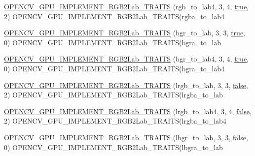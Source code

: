 \begin{DoxyCompactItemize}
\hyperlink{namespacecv_1_1gpu_1_1device_a70dc4c7bdbee3eb29835242b0f7cce81}{O\-P\-E\-N\-C\-V\-\_\-\-G\-P\-U\-\_\-\-I\-M\-P\-L\-E\-M\-E\-N\-T\-\_\-\-R\-G\-B2\-Lab\-\_\-\-T\-R\-A\-I\-T\-S} (rgb\-\_\-to\-\_\-lab4, 3, 4, \hyperlink{namespacecv_1_1gpu_1_1device_ac34c172a7a1904fb0fd477321a31f926}{true}, 2) O\-P\-E\-N\-C\-V\-\_\-\-G\-P\-U\-\_\-\-I\-M\-P\-L\-E\-M\-E\-N\-T\-\_\-\-R\-G\-B2\-Lab\-\_\-\-T\-R\-A\-I\-T\-S(rgba\-\_\-to\-\_\-lab4
\item 
\hyperlink{namespacecv_1_1gpu_1_1device_a4bfbf042d11f699daedb325c0801e223}{O\-P\-E\-N\-C\-V\-\_\-\-G\-P\-U\-\_\-\-I\-M\-P\-L\-E\-M\-E\-N\-T\-\_\-\-R\-G\-B2\-Lab\-\_\-\-T\-R\-A\-I\-T\-S} (bgr\-\_\-to\-\_\-lab, 3, 3, \hyperlink{namespacecv_1_1gpu_1_1device_ac34c172a7a1904fb0fd477321a31f926}{true}, 0) O\-P\-E\-N\-C\-V\-\_\-\-G\-P\-U\-\_\-\-I\-M\-P\-L\-E\-M\-E\-N\-T\-\_\-\-R\-G\-B2\-Lab\-\_\-\-T\-R\-A\-I\-T\-S(bgra\-\_\-to\-\_\-lab
\item 
\hyperlink{namespacecv_1_1gpu_1_1device_ae18450869a06c3a19b75a9256e43fbbb}{O\-P\-E\-N\-C\-V\-\_\-\-G\-P\-U\-\_\-\-I\-M\-P\-L\-E\-M\-E\-N\-T\-\_\-\-R\-G\-B2\-Lab\-\_\-\-T\-R\-A\-I\-T\-S} (bgr\-\_\-to\-\_\-lab4, 3, 4, \hyperlink{namespacecv_1_1gpu_1_1device_ac34c172a7a1904fb0fd477321a31f926}{true}, 0) O\-P\-E\-N\-C\-V\-\_\-\-G\-P\-U\-\_\-\-I\-M\-P\-L\-E\-M\-E\-N\-T\-\_\-\-R\-G\-B2\-Lab\-\_\-\-T\-R\-A\-I\-T\-S(bgra\-\_\-to\-\_\-lab4
\item 
\hyperlink{namespacecv_1_1gpu_1_1device_a666cb0c8f74cbdc953c132eaab075893}{O\-P\-E\-N\-C\-V\-\_\-\-G\-P\-U\-\_\-\-I\-M\-P\-L\-E\-M\-E\-N\-T\-\_\-\-R\-G\-B2\-Lab\-\_\-\-T\-R\-A\-I\-T\-S} (lrgb\-\_\-to\-\_\-lab, 3, 3, \hyperlink{namespacecv_1_1gpu_1_1device_af8d6418be1712e83b4f398e7e7273026}{false}, 2) O\-P\-E\-N\-C\-V\-\_\-\-G\-P\-U\-\_\-\-I\-M\-P\-L\-E\-M\-E\-N\-T\-\_\-\-R\-G\-B2\-Lab\-\_\-\-T\-R\-A\-I\-T\-S(lrgba\-\_\-to\-\_\-lab
\item 
\hyperlink{namespacecv_1_1gpu_1_1device_ae755a695a5fab19cd69cc97af1f24d73}{O\-P\-E\-N\-C\-V\-\_\-\-G\-P\-U\-\_\-\-I\-M\-P\-L\-E\-M\-E\-N\-T\-\_\-\-R\-G\-B2\-Lab\-\_\-\-T\-R\-A\-I\-T\-S} (lrgb\-\_\-to\-\_\-lab4, 3, 4, \hyperlink{namespacecv_1_1gpu_1_1device_af8d6418be1712e83b4f398e7e7273026}{false}, 2) O\-P\-E\-N\-C\-V\-\_\-\-G\-P\-U\-\_\-\-I\-M\-P\-L\-E\-M\-E\-N\-T\-\_\-\-R\-G\-B2\-Lab\-\_\-\-T\-R\-A\-I\-T\-S(lrgba\-\_\-to\-\_\-lab4
\item 
\hyperlink{namespacecv_1_1gpu_1_1device_a1a270f51fd090530afcab82425d54d8b}{O\-P\-E\-N\-C\-V\-\_\-\-G\-P\-U\-\_\-\-I\-M\-P\-L\-E\-M\-E\-N\-T\-\_\-\-R\-G\-B2\-Lab\-\_\-\-T\-R\-A\-I\-T\-S} (lbgr\-\_\-to\-\_\-lab, 3, 3, \hyperlink{namespacecv_1_1gpu_1_1device_af8d6418be1712e83b4f398e7e7273026}{false}, 0) O\-P\-E\-N\-C\-V\-\_\-\-G\-P\-U\-\_\-\-I\-M\-P\-L\-E\-M\-E\-N\-T\-\_\-\-R\-G\-B2\-Lab\-\_\-\-T\-R\-A\-I\-T\-S(lbgra\-\_\-to\-\_\-lab

\end{DoxyCompactItemize}
